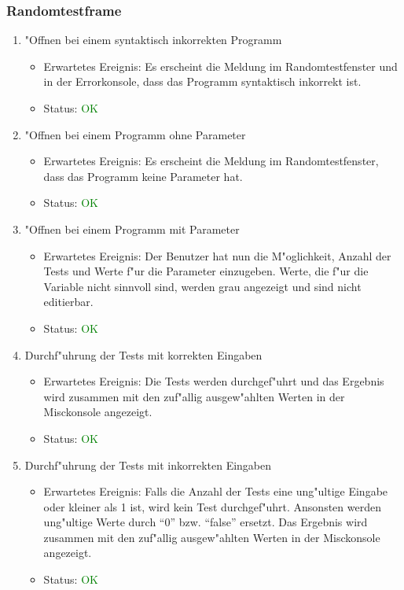 \subsubsection{Randomtestframe}
\begin{enumerate}
\item "Offnen bei einem syntaktisch inkorrekten Programm
\begin{itemize}
\item Erwartetes Ereignis: Es erscheint die Meldung im Randomtestfenster und in der Errorkonsole, dass das Programm syntaktisch inkorrekt ist.
\item Status: \textcolor{green}{OK}
\end{itemize}
\item "Offnen bei einem Programm ohne Parameter
\begin{itemize}
\item Erwartetes Ereignis: Es erscheint die Meldung im Randomtestfenster, dass das Programm keine Parameter hat.
\item Status: \textcolor{green}{OK}
\end{itemize}
\item "Offnen bei einem Programm mit Parameter
\begin{itemize}
\item Erwartetes Ereignis: Der Benutzer hat nun die M"oglichkeit, Anzahl der Tests und Werte f"ur die Parameter einzugeben. Werte, die f"ur die Variable nicht sinnvoll sind, werden grau angezeigt und sind nicht editierbar.
\item Status: \textcolor{green}{OK}
\end{itemize}
\item Durchf"uhrung der Tests mit korrekten Eingaben
\begin{itemize}
\item Erwartetes Ereignis: Die Tests werden durchgef"uhrt und das Ergebnis wird zusammen mit den zuf"allig ausgew"ahlten Werten in der Misckonsole angezeigt.
\item Status: \textcolor{green}{OK}
\end{itemize}
\item Durchf"uhrung der Tests mit inkorrekten Eingaben
\begin{itemize}
\item Erwartetes Ereignis: Falls die Anzahl der Tests eine ung"ultige Eingabe oder kleiner als 1 ist, wird kein Test durchgef"uhrt. Ansonsten werden ung"ultige Werte durch "`0"' bzw. "`false"' ersetzt. Das Ergebnis wird zusammen mit den zuf"allig ausgew"ahlten Werten in der Misckonsole angezeigt.
\item Status: \textcolor{green}{OK}
\end{itemize}
\end{enumerate}
